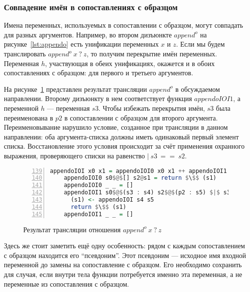 
\subsubsection{Совпадение имён в сопоставлениях с образцом}

Имена переменных, используемых в сопоставлении с образцом, могут совпадать для разных аргументов.
Например, во втором дизъюнкте $append^o$ на рисунке~\ref{lst:appendo} есть унификации переменных $x$ и $z$.
Если мы будем транслировать $append^o \ x \ ? \ z$, то получим перекрытие имён переменных.
Переменная $h$, участвующая в обеих унификациях, окажется и в обоих сопоставлениях с образцом: для первого и третьего аргументов.

На рисунке~\ref{lst:appendoIOITR} представлен результат трансляции $append^o$ в обсуждаемом направлении.
Второму дизъюнкту в нем соответствует функция $appendoIOI1$, а переменной $h$ --- переменная $s3$.
Чтобы избежать перекрытия имён, $s3$ была переименована в $p2$ в сопоставлении с образцом для второго аргумента.
Переименовывание нарушило условие, созданное при трансляции в данном направлении: оба аргумента-списка должны иметь одинаковый первый элемент списка.
Восстановление этого условия происходит за счёт применения охранного выражения, проверяющего списки на равенство $|~s3~==~s2$.

\begin{figure}[h!]
  \begin{center}
  \begin{minipage}{0.8\textwidth}
  \begin{lstlisting}[language=Haskell, frame=single, numbers=left,numberstyle=\small, firstnumber=139, escapechar=|]
    appendoIOI x0 x1 = appendoIOI0 x0 x1 ++ appendoIOI1 x0 x1
    appendoIOI0 s0$@$[] s2@s1 = return $\$$ (s1)
    appendoIOI0 _ _ = []
    appendoIOI1 s0$@$(s3 : s4) s2$@$(p2 : s5) $|$ s3 == p2 = do
      (s1) <- appendoIOI s4 s5
      return $\$$ (s1)
    appendoIOI1 _ _ = []
    \end{lstlisting}
  \end{minipage}
  \end{center}
  \caption{Результат трансляции отношения $append^o \ x \ ? \ z$}
  \label{lst:appendoIOITR}
\end{figure}

Здесь же стоит заметить ещё одну особенность: рядом с каждым сопоставлением с образцом находится его ``псевдоним''.
Этот псевдоним --- исходное имя входной переменной до замены на сопоставление с образцом.
Его необходимо сохранить для случая, если внутри тела функции потребуется именно эта переменная, а не переменные из сопоставления с образцом.

